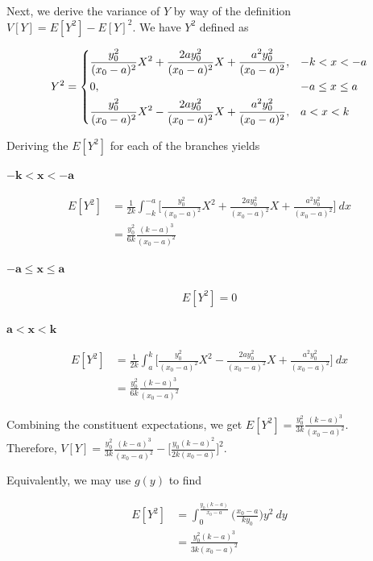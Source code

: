 \documentclass[10pt, oneside]{article}
\begin{document}
\begin{enumerate}[label=7.\arabic*]
\begin{enumerate}
	Next, we derive the variance of $Y$ by way of the definition $V[Y] = E[Y^2] - E[Y]^2$. We have $Y^2$ defined as
	
	\[ Y^2 = \begin{dcases}
	\frac{y^2_0}{(x_0 - a)^2} X^2 + \frac{2a y^2_0}{(x_0 - a)^2} X + \frac{a^2 y^2_0}{(x_0 - a)^2}, & -k < x < -a \\
	0, &-a \leq x \leq a \\
	\frac{y^2_0}{(x_0 - a)^2} X^2 - \frac{2ay^2_0}{(x_0 - a)^2} X + \frac{a^2 y^2_0}{(x_0 - a)^2}, &a < x < k
	\end{dcases} \]
	
	Deriving the $E[Y^2]$ for each of the branches yields
	
	$\bm{ -k < x < -a }$
	
	\begin{align*}
	E[Y^2] &= \frac{1}{2k} \int^{-a}_{-k} \Big[ \frac{y^2_0}{(x_0 - a)^2} X^2 + \frac{2a y^2_0}{(x_0 - a)^2} X + \frac{a^2 y^2_0}{(x_0 - a)^2} \Big] \ dx \\
	&= \frac{y^2_0}{6k} \frac{(k-a)^3}{(x_0 - a)^2}
	\end{align*}
	
	$\bm{-a \leq x \leq a}$
	
	\begin{align*}
	E[Y^2] = 0
	\end{align*}
	
	$\bm{a < x < k}$
	
	\begin{align*}
	E[Y^2] &= \frac{1}{2k} \int^k_a \Big[ \frac{y^2_0}{(x_0 - a)^2} X^2 - \frac{2ay^2_0}{(x_0 - a)^2} X + \frac{a^2 y^2_0}{(x_0 - a)^2} \Big] \ dx \\
	&= \boxed{ \frac{y^2_0}{6k} \frac{(k-a)^3}{(x_0 - a)^2} }
	\end{align*}
	
	Combining the constituent expectations, we get $\boxed{E[Y^2] = \frac{y^2_0}{3k} \frac{(k -a)^3}{(x_0 - a)^2} }$. \\
	Therefore, $\boxed{V[Y] = \frac{y^2_0}{3k} \frac{(k-a)^3}{(x_0 - a)^2} - \Big[ \frac{y_0 (k-a)^2}{2k (x_0 - a)} \Big]^2 }$.
	
	Equivalently, we may use $g(y)$ to find
	
	\begin{align*}
	E[Y^2] &= \int^{\frac{y_0 (k-a)}{x_0 - a}}_0 \Big( \frac{x_0 - a}{k y_0} \Big) y^2 \ dy \\
	&= \boxed{\frac{y^2_0 (k-a)^3}{3k (x_0 - a)^2}}
	\end{align*}


\end{enumerate}
\end{enumerate}
\end{document}
